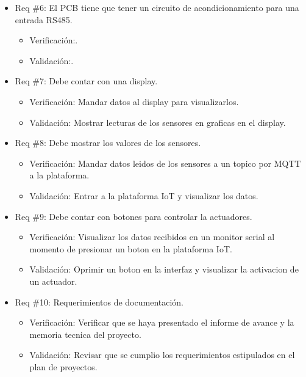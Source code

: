 \documentclass[
11pt, %
codirector, %
]{charter}
\begin{document}
\begin{itemize}
	\item Req \#6: El PCB tiene que tener un circuito de acondicionamiento para una entrada RS485.
	\begin{itemize}
		\item Verificación:.
		\item Validación:. 
	\end{itemize}

	\item Req \#7: Debe contar con una display.
	\begin{itemize}
		\item Verificación: Mandar datos al display para visualizarlos.
		\item Validación: Mostrar lecturas de los sensores en graficas en el display. 
	\end{itemize}

	\item Req \#8: Debe mostrar los valores de los sensores.
	\begin{itemize}
		\item Verificación: Mandar datos leidos de los sensores a un topico por MQTT a la plataforma.
		\item Validación: Entrar a la plataforma IoT y visualizar los datos. 
	\end{itemize}

	\item Req \#9: Debe contar con botones para controlar la actuadores.
	\begin{itemize}
		\item Verificación: Visualizar los datos recibidos en un monitor serial al momento de presionar un boton en la plataforma IoT.
		\item Validación: Oprimir un boton en la interfaz y visualizar la activacion de un actuador. 
	\end{itemize}

	\item Req \#10: Requerimientos de documentación.
	\begin{itemize}
		\item Verificación: Verificar que se haya presentado el informe de avance y la memoria tecnica del proyecto.
		\item Validación: Revisar que se cumplio los requerimientos estipulados en el plan de proyectos. 
	\end{itemize}
	
\end{itemize}
\end{document}

